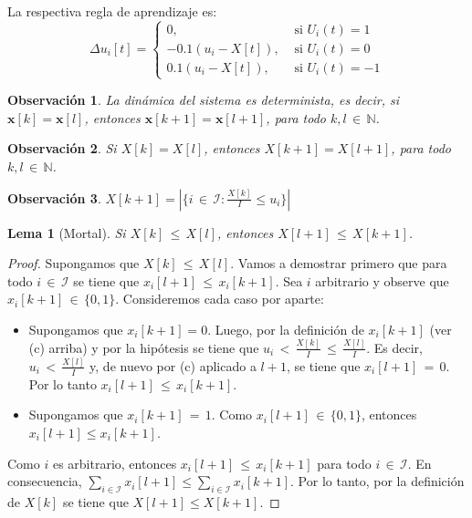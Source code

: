 \documentclass{article}
\newtheorem{lema}{Lema}
\newtheorem{obs}{Observación}
\begin{document}
La respectiva regla de aprendizaje es:
\begin{equation}
    {\Delta}u_i[t]=\begin{cases} 0, & \mbox{ si  }U_i(t)=1 \\ -0.1(u_i-X[t]), & \mbox{ si }U_i(t)=0\\0.1(u_i-X[t]), & \mbox{ si }U_i(t)=-1 \end{cases}
\end{equation}

\begin{obs}
La dinámica del sistema es determinista, es decir, si $\bm{x}[k]=\bm{x}[l]$, entonces $\bm{x}[k{+}1]=\bm{x}[l{+}1]$, para todo $k,l\,{\in}\,\mathbb{N}$.
\end{obs}

\begin{obs}
Si $X[k]=X[l]$, entonces $X[k{+}1]=X[l{+}1]$, para todo $k,l\,{\in}\,\mathbb{N}$.
\end{obs}

\begin{obs}
$X[k{+}1]=|\{i\,{\in}\,\mathcal{I}:\frac{X[k]}{I}\leq u_i\}|$
\end{obs}

\begin{lema}[Mortal]
Si $X[k]\,{\leq}\,X[l]$, entonces $X[l{+}1]\,{\leq}\,X[k{+}1]$.
\end{lema}

\begin{proof}
Supongamos que $X[k]\,{\leq}\,X[l]$. Vamos a demostrar primero que para todo $i\,{\in}\,\mathcal{I}$ se tiene que $x_i[l{+}1]\,{\leq}\, x_i[k{+}1]$. Sea $i$ arbitrario y observe que $x_i[k{+}1]\,{\in}\,\{0, 1\}$. Consideremos cada caso por aparte:
%
\begin{itemize}
\item Supongamos que $x_i[k{+}1]=0$. Luego, por la definición de $x_i[k{+}1]$ (ver (c) arriba) y por la hipótesis se tiene que $u_i\,{<}\,\frac{X[k]}{I}\,{\leq}\,\frac{X[l]}{I}$. Es decir, $u_i\,{<}\,\frac{X[l]}{I}$ y, de nuevo por (c) aplicado a $l{+}1$, se tiene que $x_i[l{+}1]\,{=}\,0$. Por lo tanto $x_i[l{+}1]\,{\leq}\,x_i[k{+}1]$.
\item Supongamos que $x_i[k{+}1]\,{=}\,1$. Como $x_i[l{+}1]\,{\in}\,\{0,1\}$, entonces $x_i[l{+}1]\leq x_i[k{+}1]$.
\end{itemize}
%
Como $i$ es arbitrario, entonces $x_i[l{+}1]\,{\leq}\, x_i[k{+}1]$ para todo $i\,{\in}\,\mathcal{I}$. En consecuencia, $\sum_{i\in\mathcal{I}} x_i[l{+}1]\leq \sum_{i\in\mathcal{I}} x_i[k{+}1]$. Por lo tanto, por la definición de $X[k]$ se tiene que $X[l{+}1]\leq X[k{+}1]$.
\end{proof}
\end{document}
